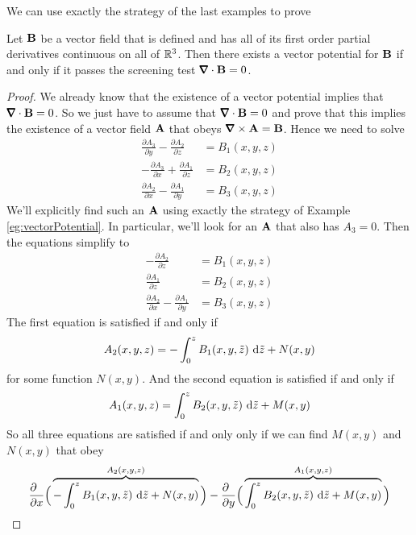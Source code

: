 We can use exactly the strategy of the last examples to prove
\begin{theorem}\label{thm:screenVectorB}
Let $\mathbf{B}$ be a vector field that is defined and has all of its 
first order partial derivatives continuous on all of $\mathbb{R}^3$.
Then there exists a vector potential for $\mathbf{B}$ if and only if 
it passes the screening test $\vnabla\cdot\vB=0$.
\end{theorem}

\begin{proof}
We already know that the existence of a vector potential implies that
$\vnabla\cdot\vB=0$. So we just have to assume that $\vnabla\cdot\vB=0$
and prove that this implies the existence of a vector field $\mathbf{A}$  that
obeys $\vnabla\times\vA = \vB$. Hence we need to solve
\begin{align*}
\frac{\partial A_3}{\partial y} -\frac{\partial A_2}{\partial z} &= B_1(x,y,z)\\
-\frac{\partial A_3}{\partial x} +\frac{\partial A_1}{\partial z}&=B_2(x,y,z) \\
\frac{\partial A_2}{\partial x} -\frac{\partial A_1}{\partial y}&=B_3(x,y,z)
\end{align*}
We'll explicitly find such an $\mathbf{A}$ using exactly the strategy of
Example \ref{eg:vectorPotential}. In particular, we'll look for an $\mathbf{A}$
that also has $A_3=0$. Then the equations simplify to
 \begin{align*}
 -\frac{\partial A_2}{\partial z} &=B_1(x,y,z)\\
  \frac{\partial A_1}{\partial z} &=B_2(x,y,z) \\
\frac{\partial A_2}{\partial x} -\frac{\partial A_1}{\partial y}&=B_3(x,y,z)
\end{align*}
The first equation is satisfied if and only if
\begin{equation*}
A_2(x,y,z) = -\int_0^z B_1(x,y,\tilde z)\ \mathrm{d}\tilde z +N(x,y)
\end{equation*}
for some function $N(x,y)$. And 
the second equation is satisfied if and only if
\begin{equation*}
A_1(x,y,z) = \int_0^z B_2(x,y,\tilde z)\ \dee{\tilde z} +M(x,y)
\end{equation*}
So all three equations are satisfied if and only only if we
can find $M(x,y)$ and $N(x,y)$ that obey
\begin{align*}
\frac{\partial\hfill}{\partial x}\Big(
     \overbrace{-\int_0^z B_1(x,y,\tilde z)\ \dee{\tilde z} +N(x,y)}^{A_2(x,y,z)}\Big) 
-\frac{\partial\hfill}{\partial y}\Big(
     \overbrace{\int_0^z B_2(x,y,\tilde z)\ \dee{\tilde z} +M(x,y)}^{A_1(x,y,z)}\Big)

\end{align*}
\end{proof}
